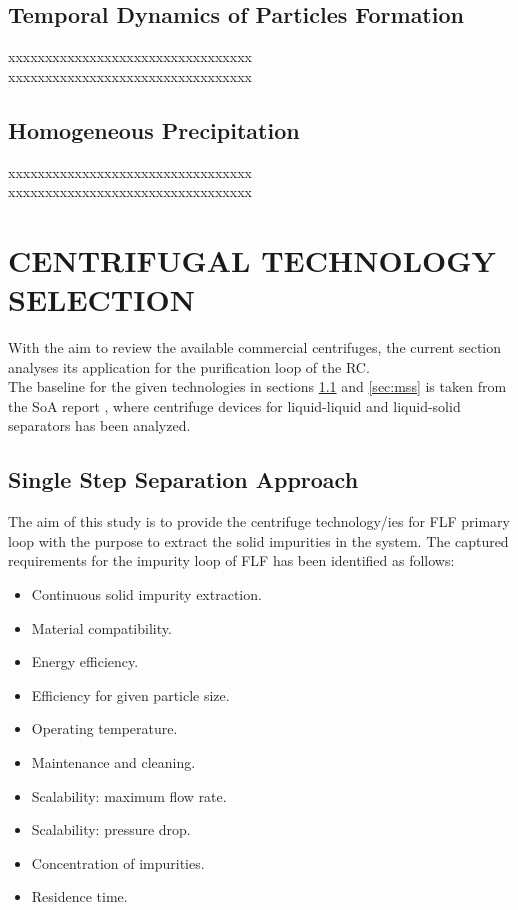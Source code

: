 \subsection{Temporal Dynamics of Particles Formation}
xxxxxxxxxxxxxxxxxxxxxxxxxxxxxxxxx \\
xxxxxxxxxxxxxxxxxxxxxxxxxxxxxxxxx 

\subsection{Homogeneous Precipitation}
xxxxxxxxxxxxxxxxxxxxxxxxxxxxxxxxx \\
xxxxxxxxxxxxxxxxxxxxxxxxxxxxxxxxx 

\newpage

\section{CENTRIFUGAL TECHNOLOGY SELECTION} \label{sec:eng}%
With the aim to review the available commercial centrifuges, the current section analyses its application for the purification loop of the RC. \\

\noindent The baseline for the given technologies in sections \ref{sec:sss} and \ref{sec:mss} is taken from the SoA report \cite{SoA}, where centrifuge devices for liquid-liquid and liquid-solid separators has been analyzed. 

\subsection{Single Step Separation Approach}\label{sec:sss}
The aim of this study is to provide the centrifuge technology/ies for FLF primary loop with the purpose to extract the solid impurities in the system. The captured requirements for the impurity loop of FLF has been identified as follows:

\begin{itemize}
	\item Continuous solid impurity extraction.
	\item Material compatibility.
	\item Energy efficiency.
	\item Efficiency for given particle size. 
	\item Operating temperature.
	\item Maintenance and cleaning.
	\item Scalability: maximum flow rate.
	\item Scalability: pressure drop.
	\item Concentration of impurities. 
	\item Residence time.
\end{itemize}

